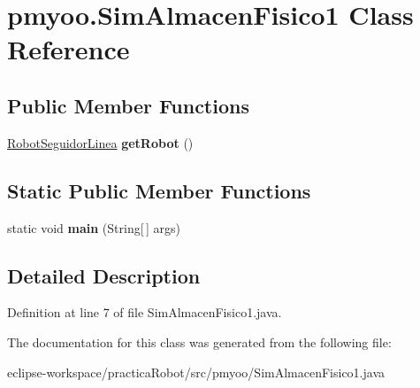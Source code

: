 \hypertarget{classpmyoo_1_1_sim_almacen_fisico1}{}\section{pmyoo.\+Sim\+Almacen\+Fisico1 Class Reference}
\label{classpmyoo_1_1_sim_almacen_fisico1}
\subsection*{Public Member Functions}
\begin{DoxyCompactItemize}
\item 
\mbox{\label{classpmyoo_1_1_sim_almacen_fisico1_ade4a4a864abb864d6f6ecb10ddc14051}} 
\mbox{\hyperlink{classpmyoo_1_1_robot_seguidor_linea}{Robot\+Seguidor\+Linea}} {\bfseries get\+Robot} ()
\end{DoxyCompactItemize}
\subsection*{Static Public Member Functions}
\begin{DoxyCompactItemize}
\item 
\mbox{\label{classpmyoo_1_1_sim_almacen_fisico1_a588d445c8306fe0a7efc289b4cf7d37f}} 
static void {\bfseries main} (String\mbox{[}$\,$\mbox{]} args)
\end{DoxyCompactItemize}


\subsection{Detailed Description}


Definition at line 7 of file Sim\+Almacen\+Fisico1.\+java.



The documentation for this class was generated from the following file\+:\begin{DoxyCompactItemize}
\item 
eclipse-\/workspace/practica\+Robot/src/pmyoo/Sim\+Almacen\+Fisico1.\+java\end{DoxyCompactItemize}
